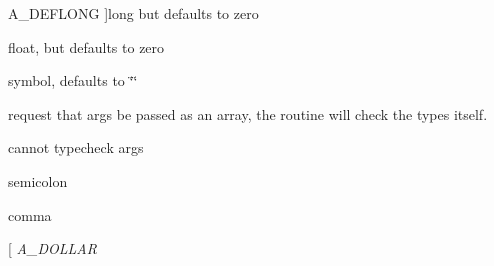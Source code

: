 \begin{Desc}
\begin{description}
{{A\_\-DEFLONG}
\label{group__atom_gga8aa6700e9f00b132eb376db6e39ade47a7bd979db3dcf86909e24a1d1452e2205}
}]long but defaults to zero \item[{\em 
\hypertarget{group__atom_gga8aa6700e9f00b132eb376db6e39ade47a42b644240dcbb90fe67282a4d0688776}{
A\_\-DEFFLOAT}
\label{group__atom_gga8aa6700e9f00b132eb376db6e39ade47a42b644240dcbb90fe67282a4d0688776}
}]float, but defaults to zero \item[{\em 
\hypertarget{group__atom_gga8aa6700e9f00b132eb376db6e39ade47aa010616276cb89bcd04bcba611e18d51}{
A\_\-DEFSYM}
\label{group__atom_gga8aa6700e9f00b132eb376db6e39ade47aa010616276cb89bcd04bcba611e18d51}
}]symbol, defaults to \char`\"{}\char`\"{} \item[{\em 
\hypertarget{group__atom_gga8aa6700e9f00b132eb376db6e39ade47a81c1a8550f038db16a619167a70a79b6}{
A\_\-GIMME}
\label{group__atom_gga8aa6700e9f00b132eb376db6e39ade47a81c1a8550f038db16a619167a70a79b6}
}]request that args be passed as an array, the routine will check the types itself. \item[{\em 
\hypertarget{group__atom_gga8aa6700e9f00b132eb376db6e39ade47af48193ec36e53b1507d81c49873c8d7a}{
A\_\-CANT}
\label{group__atom_gga8aa6700e9f00b132eb376db6e39ade47af48193ec36e53b1507d81c49873c8d7a}
}]cannot typecheck args \item[{\em 
\hypertarget{group__atom_gga8aa6700e9f00b132eb376db6e39ade47ac105be4ef726ee36c4330e16bb24706e}{
A\_\-SEMI}
\label{group__atom_gga8aa6700e9f00b132eb376db6e39ade47ac105be4ef726ee36c4330e16bb24706e}
}]semicolon \item[{\em 
\hypertarget{group__atom_gga8aa6700e9f00b132eb376db6e39ade47a07c3484085a3217107acec059d17b945}{
A\_\-COMMA}
\label{group__atom_gga8aa6700e9f00b132eb376db6e39ade47a07c3484085a3217107acec059d17b945}
}]comma \item[{\em 
\hypertarget{group__atom_gga8aa6700e9f00b132eb376db6e39ade47af0a5a9017f6b59e82a4859cd0560d36b}{
A\_\-DOLLAR}
}
\end{description}
\end{Desc}
